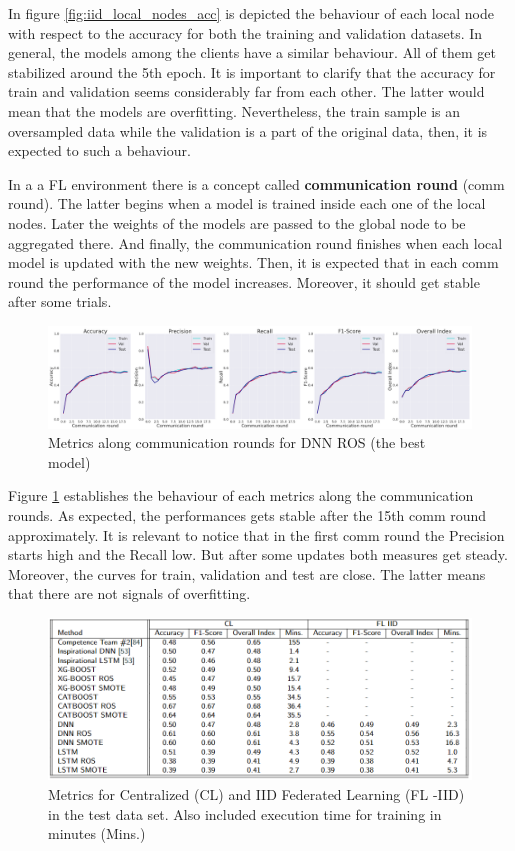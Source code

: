 In figure \ref{fig:iid_local_nodes_acc} is depicted the behaviour of each local node with respect to the accuracy for both the training and validation datasets. In general, the models among the clients have a similar behaviour. All of them get stabilized around the 5th epoch. It is important to clarify that the accuracy for train and validation seems considerably far from each other. The latter would mean that the models are overfitting. Nevertheless, the train sample is an oversampled data while the validation is a part of the original data, then, it is expected to such a behaviour.

In a a FL environment there is a concept called \textbf{communication round} (comm round). The latter begins when a model is trained inside each one of the local nodes. Later the weights of the models are passed to the global node to be aggregated there. And finally, the communication round finishes when each local model is updated with the new weights. Then, it is expected that in each comm round the performance of the model increases. Moreover, it should get stable after some trials.

\begin{figure}[H]
\centering
\includegraphics[scale=0.4]{img/comm_round_metrics_DNNROS.png}
\caption{Metrics along communication rounds for DNN ROS (the best model)}
\label{fig:comm_round_metrics_DNNROS}
\end{figure}

Figure \ref{fig:comm_round_metrics_DNNROS} establishes the behaviour of each metrics along the communication rounds. As expected, the performances gets stable after the 15th comm round approximately. It is relevant to notice that in the first comm round the Precision starts high and the Recall low. But after some updates both measures get steady. Moreover, the curves for train, validation and test are close. The latter means that there are not signals of overfitting.


\begin{figure}[H]
\centering
\includegraphics[scale=0.55]{img/metrics_CL_FLIID.png}
\caption{Metrics for Centralized (CL) and IID Federated Learning (FL -IID) in the test data set. Also included execution time for  training in minutes (Mins.)}
\label{figure:metrics_CL_FLIID}
\end{figure}


